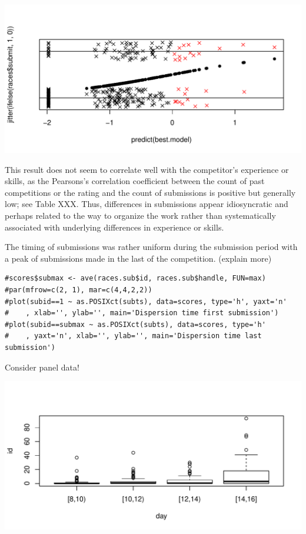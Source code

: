 \documentclass[12pt,]{article}
\begin{document}
\includegraphics{Figures/unnamed-chunk-17-1.pdf}

This result does not seem to correlate well with the competitor's
experience or skills, as the Pearsons's correlation coefficient between
the count of past competitions or the rating and the count of
submissions is positive but generally low; see Table XXX. Thus,
differences in submissions appear idiosyncratic and perhaps related to
the way to organize the work rather than systematically associated with
underlying differences in experience or skills.

The timing of submissions was rather uniform during the submission
period with a peak of submissions made in the last of the competition.
(explain more)

\begin{verbatim}
#scores$submax <- ave(races.sub$id, races.sub$handle, FUN=max)
#par(mfrow=c(2, 1), mar=c(4,4,2,2))
#plot(subid==1 ~ as.POSIXct(subts), data=scores, type='h', yaxt='n'
#    , xlab='', ylab='', main='Dispersion time first submission')
#plot(subid==submax ~ as.POSIXct(subts), data=scores, type='h'
#    , yaxt='n', xlab='', ylab='', main='Dispersion time last submission')
\end{verbatim}

Consider panel data!

\includegraphics{Figures/unnamed-chunk-19-1.pdf}
\end{document}
